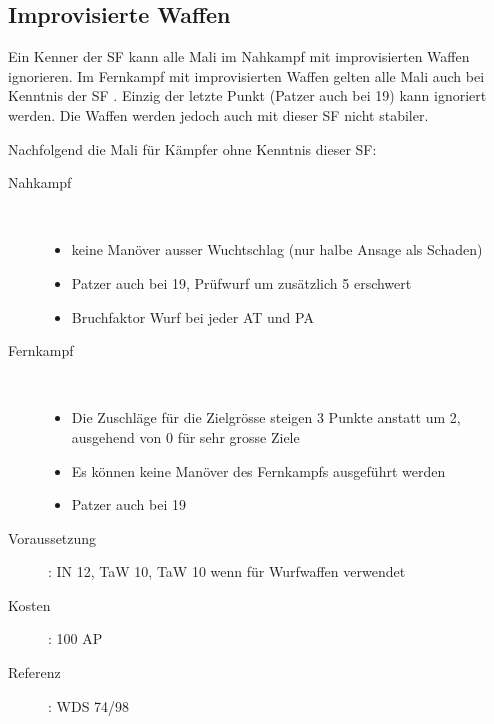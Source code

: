 \subsection{Improvisierte Waffen}
\label{sf.improvisierte_waffen}
Ein Kenner der SF  kann alle Mali im Nahkampf mit improvisierten Waffen ignorieren.
Im Fernkampf mit improvisierten Waffen gelten alle Mali auch bei Kenntnis der SF .
Einzig der letzte Punkt (Patzer auch bei 19) kann ignoriert werden.
Die Waffen werden jedoch auch mit dieser SF nicht stabiler.

Nachfolgend die Mali für Kämpfer ohne Kenntnis dieser SF:

\begin{description}
    \item[Nahkampf] \hfill \\
        \begin{itemize}
            \item keine Manöver ausser Wuchtschlag (nur halbe Ansage als Schaden)
            \item Patzer auch bei 19, Prüfwurf um zusätzlich 5 erschwert
            \item Bruchfaktor Wurf bei jeder AT und PA
        \end{itemize}
    \item[Fernkampf] \hfill \\
        \begin{itemize}
            \item Die Zuschläge für die Zielgrösse steigen 3 Punkte anstatt um 2, ausgehend von 0 für sehr grosse Ziele
            \item Es können keine Manöver des Fernkampfs ausgeführt werden
            \item Patzer auch bei 19
        \end{itemize}
\end{description}

\begin{description}
    \item[Voraussetzung]:
        IN 12, TaW  10, TaW  10 wenn für Wurfwaffen verwendet
    \item [Kosten]:
        100 AP
    \item [Referenz]:
        WDS 74/98
\end{description}
